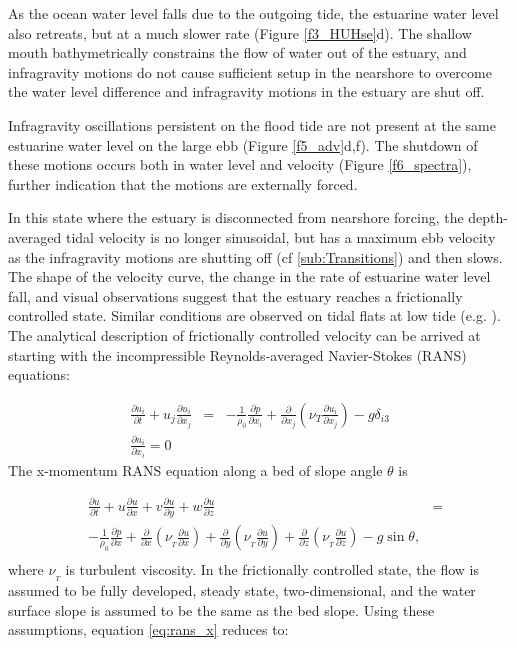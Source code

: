 As the ocean water level falls due to the outgoing tide, the estuarine
water level also retreats, but at a much slower rate (Figure \ref{f3_HUHse}d).
The shallow mouth bathymetrically constrains the flow of water out
of the estuary, and infragravity motions do not cause sufficient setup
in the nearshore to overcome the water level difference and infragravity
motions in the estuary are shut off. 

Infragravity oscillations persistent on the flood tide are not present
at the same estuarine water level on the large ebb (Figure \ref{f5_adv}d,f).
The shutdown of these motions occurs both in water level and velocity
(Figure \ref{f6_spectra}), further indication that the motions are
externally forced.

In this state where the estuary is disconnected from nearshore forcing,
the depth-averaged tidal velocity is no longer sinusoidal, but has
a maximum ebb velocity as the infragravity motions are shutting off
(cf \ref{sub:Transitions}) and then slows. The shape of the velocity
curve, the change in the rate of estuarine water level fall, and visual
observations suggest that the estuary reaches a frictionally controlled
state. Similar conditions are observed on tidal flats at low tide
(e.g. \cite{ralston_effects_2013}). The analytical description
of frictionally controlled velocity can be arrived at starting with
the incompressible Reynolds-averaged Navier-Stokes (RANS) equations:

\begin{eqnarray}
\frac{\partial u_{i}}{\partial t}+u_{j}\frac{\partial u_{i}}{\partial x_{j}} & = & -\frac{1}{\rho_{0}}\frac{\partial p}{\partial x_{i}}+\frac{\partial}{\partial x_{j}}\left(\nu_{T}\frac{\partial u_{i}}{\partial x_{j}}\right)-g\delta_{i3}\nonumber \\
\frac{\partial u_{i}}{\partial x_{i}}=0
\end{eqnarray}
The x-momentum RANS equation along a bed of slope angle $\theta$
is 

\begin{eqnarray}
 & \frac{\partial u}{\partial t}+u\frac{\partial u}{\partial x}+v\frac{\partial u}{\partial y}+w\frac{\partial u}{\partial z} & =\nonumber \\
 & -\frac{1}{\rho_{0}}\frac{\partial p}{\partial x}+\frac{\partial}{\partial x}\left(\nu_{_{T}}\frac{\partial u}{\partial x}\right)+\frac{\partial}{\partial y}\left(\nu_{_{T}}\frac{\partial u}{\partial y}\right)+\frac{\partial}{\partial z}\left(\nu_{_{T}}\frac{\partial u}{\partial z}\right)-g\sin\theta,\label{eq:rans_x}\\
\nonumber 
\end{eqnarray}
where $\nu_{_{T}}$ is turbulent viscosity. In the frictionally controlled
state, the flow is assumed to be fully developed, steady state, two-dimensional,
and the water surface slope is assumed to be the same as the bed slope.
Using these assumptions, equation \ref{eq:rans_x} reduces to:

